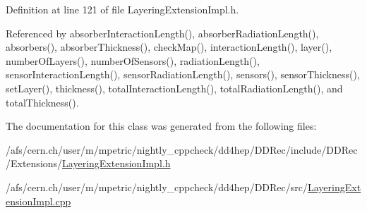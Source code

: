 Definition at line 121 of file LayeringExtensionImpl.h.

Referenced by absorberInteractionLength(), absorberRadiationLength(), absorbers(), absorberThickness(), checkMap(), interactionLength(), layer(), numberOfLayers(), numberOfSensors(), radiationLength(), sensorInteractionLength(), sensorRadiationLength(), sensors(), sensorThickness(), setLayer(), thickness(), totalInteractionLength(), totalRadiationLength(), and totalThickness().

The documentation for this class was generated from the following files:\begin{DoxyCompactItemize}
\item 
/afs/cern.ch/user/m/mpetric/nightly\_\-cppcheck/dd4hep/DDRec/include/DDRec/Extensions/\hyperlink{_layering_extension_impl_8h}{LayeringExtensionImpl.h}\item 
/afs/cern.ch/user/m/mpetric/nightly\_\-cppcheck/dd4hep/DDRec/src/\hyperlink{_layering_extension_impl_8cpp}{LayeringExtensionImpl.cpp}\end{DoxyCompactItemize}
